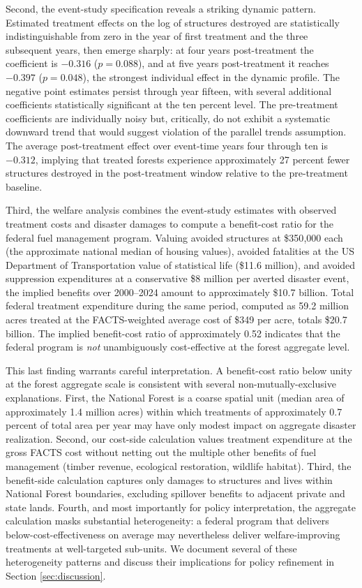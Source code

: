 \documentclass[12pt, letterpaper]{article}
\begin{document}
Second, the event-study specification reveals a striking dynamic pattern. Estimated treatment effects on the log of structures destroyed are statistically indistinguishable from zero in the year of first treatment and the three subsequent years, then emerge sharply: at four years post-treatment the coefficient is $-0.316$ ($p = 0.088$), and at five years post-treatment it reaches $-0.397$ ($p = 0.048$), the strongest individual effect in the dynamic profile. The negative point estimates persist through year fifteen, with several additional coefficients statistically significant at the ten percent level. The pre-treatment coefficients are individually noisy but, critically, do not exhibit a systematic downward trend that would suggest violation of the parallel trends assumption. The average post-treatment effect over event-time years four through ten is $-0.312$, implying that treated forests experience approximately 27 percent fewer structures destroyed in the post-treatment window relative to the pre-treatment baseline.

Third, the welfare analysis combines the event-study estimates with observed treatment costs and disaster damages to compute a benefit-cost ratio for the federal fuel management program. Valuing avoided structures at \$350{,}000 each (the approximate national median of housing values), avoided fatalities at the US Department of Transportation value of statistical life (\$11.6 million), and avoided suppression expenditures at a conservative \$8 million per averted disaster event, the implied benefits over 2000--2024 amount to approximately \$10.7 billion. Total federal treatment expenditure during the same period, computed as 59.2 million acres treated at the FACTS-weighted average cost of \$349 per acre, totals \$20.7 billion. The implied benefit-cost ratio of approximately 0.52 indicates that the federal program is \textit{not} unambiguously cost-effective at the forest aggregate level.

This last finding warrants careful interpretation. A benefit-cost ratio below unity at the forest aggregate scale is consistent with several non-mutually-exclusive explanations. First, the National Forest is a coarse spatial unit (median area of approximately 1.4 million acres) within which treatments of approximately 0.7 percent of total area per year may have only modest impact on aggregate disaster realization. Second, our cost-side calculation values treatment expenditure at the gross FACTS cost without netting out the multiple other benefits of fuel management (timber revenue, ecological restoration, wildlife habitat). Third, the benefit-side calculation captures only damages to structures and lives within National Forest boundaries, excluding spillover benefits to adjacent private and state lands. Fourth, and most importantly for policy interpretation, the aggregate calculation masks substantial heterogeneity: a federal program that delivers below-cost-effectiveness on average may nevertheless deliver welfare-improving treatments at well-targeted sub-units. We document several of these heterogeneity patterns and discuss their implications for policy refinement in Section \ref{sec:discussion}.
\end{document}
